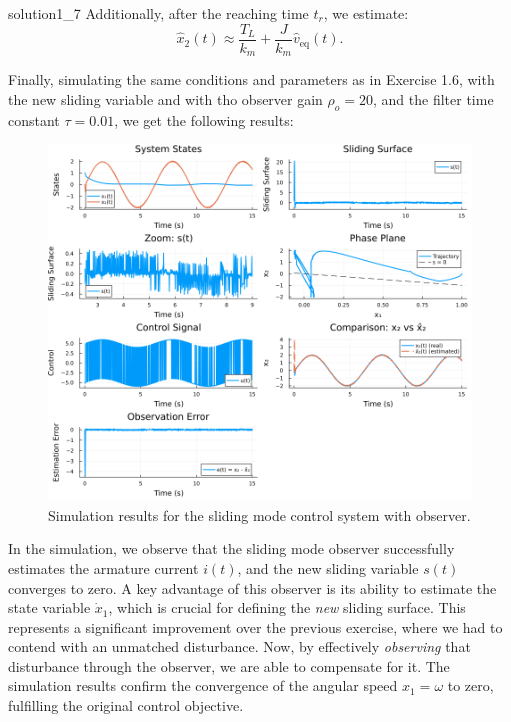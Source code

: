 \begin{solution}{}{solution1_7}
	Additionally, after the reaching time \( t_r \), we estimate:
	\[
		\hat{x}_2(t) \approx \frac{T_L}{k_m} + \frac{J}{k_m}\hat{v}_{\text{eq}}(t).
	\]

    Finally, simulating the same conditions and parameters as in Exercise 1.6, with the new sliding variable and with tho observer gain $\rho_o = 20$, and the filter time constant $\tau = 0.01$, we get the following results:

    \begin{figure}[H]
        \centering
        \includegraphics[width=1\textwidth]{img/problem1_7.png}
        \caption{Simulation results for the sliding mode control system with observer.}
        \label{fig:problem1_7}
    \end{figure}

    In the simulation, we observe that the sliding mode observer successfully estimates the armature current \( i(t) \), and the new sliding variable \( s(t) \) converges to zero. A key advantage of this observer is its ability to estimate the state variable \( \dot{x}_1 \), which is crucial for defining the \textit{new} sliding surface. This represents a significant improvement over the previous exercise, where we had to contend with an unmatched disturbance. Now, by effectively \textit{observing} that disturbance through the observer, we are able to compensate for it. The simulation results confirm the convergence of the angular speed \( x_1 = \omega \) to zero, fulfilling the original control objective.

\end{solution}